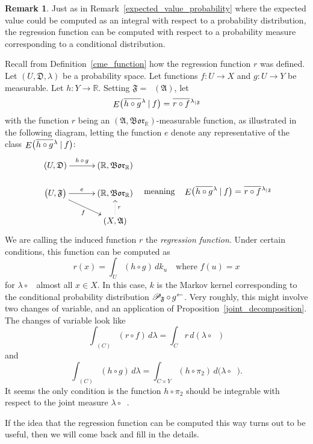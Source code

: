 \documentclass[
twoside=true,
paper=letter,
fontsize=9pt,
pagesize=auto,
leqno,
openany,
headsepline,
overfullrule,
]{scrbook}
\theoremstyle{plain}
\theoremstyle{plain}
\theoremstyle{definition}
\newtheorem{rmk}[thm]{Remark}
\theoremstyle{bfnoteitalic}
\theoremstyle{bfnoteroman}
\newcommand{\sigalg}[1]{\mathfrak{#1}}
\newcommand{\cali}[1]{\mathscr{#1}}
\newcommand{\given}{\mathbin{\vert}}
\newcommand{\kondexpgvn}[2]
{\mathop{E}\bigl(#1\given#2\bigr)}
\newcommand{\condprobop}[1]{\mathop{\cali{P}\hspace{-1pt}}\nolimits_{#1}}
\newcommand{\borel}{\mathfrak{Bor}}
\newcommand{\restrictedto}[1]{_{\lvert#1}\kern-1.5pt}
\newcommand{\preimage}[1]{\mathop{#1^{\leftarrow}}}
\newcommand{\R}{\mathbb{R}}
\newcommand{\sigmaalgebra}{\sigalg{A}}
\newcommand{\funcf}{f}
\newcommand{\funcg}{g}
\newcommand{\funch}{h}
\newcommand{\funck}{k}
\newcommand{\measurespace}{X}
\newcommand{\measurespaceii}{Y}
\newcommand{\mspaceelt}{x}
\newcommand{\measlambda}{\lambda}
\newcommand{\setiii}{C}
\newcommand{\projectiontwo}{\pi_2}
\newcommand{\uspace}{U}%
\newcommand{\uspaceelt}{u}
\newcommand{\uspacesig}{\sigalg{D}}
\newcommand*\xbar[1]{%
   \hbox{%
     \vbox{%
       \hrule height 0.4pt %
       \kern0.4ex%
       \hbox{%
         \ensuremath{#1}%
       }%
     }%
   }%
}
\newcommand{\lebclass}[1]{\hspace{.5pt}\xbar{#1}\hspace{0.5pt}}
\newcommand{\ellclass}[2]{\lebclass{#1}^{#2}}
\begin{document}
\begin{rmk}
Just as in Remark~\ref{expected_value_probability} where the expected value could be computed as an integral with respect to a probability distribution, the regression function can be computed with respect to a probability measure corresponding to a conditional distribution.

Recall from Definition~\ref{cme_function} how the regression function $r$ was defined.
Let
$(\uspace,\uspacesig,\measlambda)$ be a probability space.
Let functions
$\funcf:\uspace\to\measurespace$
and
$\funcg:\uspace\to\measurespaceii$
be measurable.
Let $\funch:\measurespaceii\to\R$.
Setting $\sigalg{F}=\preimage{\funcf}(\sigmaalgebra)$, let
\[
\kondexpgvn{\ellclass{\funch\circ\funcg}{\measlambda}}{\funcf}
=
\ellclass{r \circ \funcf}{\measlambda\restrictedto{\sigalg{F}}}
\]
with the function  $r$ being an $(\sigmaalgebra,\borel_\R)$\hyp{}measurable function,
as illustrated in the following diagram, letting the function $e$ denote any representative of the class
$\kondexpgvn{\ellclass{\funch\circ\funcg}{\measlambda}}{\funcf}$:
\[
\begin{gathered}
\xymatrix@R=16pt@C=30pt{
(\uspace, \uspacesig)
\ar[r]^-{\funch\,\circ\,\funcg}
&
(\R, \borel_\R)
\\
\bigl(\uspace, \sigalg{F} \bigr)
\ar[r]^-{e}
\ar[dr]_{\funcf}
&
(\R,\borel_\R)
\\
&
(\measurespace, \sigmaalgebra)
\ar@{.>}[u]_{r}
\\
}
\end{gathered}
\quad
\text{meaning}
\quad
\kondexpgvn{\ellclass{\funch\circ\funcg}{\measlambda}}{\funcf}
=
\ellclass{r \circ \funcf}{\measlambda\restrictedto{\sigalg{F}}}
\]
We are calling the induced function $r$ the \emph{regression function}.
Under certain conditions, this function can be computed as
\[
r(\mspaceelt)
=
\int_\uspace (\funch\circ\funcg) \, d \funck_\uspaceelt
\quad
\text{where $\funcf(\uspaceelt)=\mspaceelt$}
\]
for $\measlambda\circ \preimage{\funcf}$ almost all $\mspaceelt\in\measurespace$.
In this case, $\funck$ is the Markov kernel corresponding to the conditional probability distribution
$\condprobop{\sigalg{F}}\circ \preimage{\funcg}$.
Very roughly, this might involve two changes of variable, and an application of
Proposition~\ref{joint_decomposition}.
The changes of variable look like
\[
\int_{\preimage{\funcf}(\setiii)}
(r\circ\funcf)\, d\measlambda
=
\int_\setiii r\, d(\lambda\circ\preimage{\funcf})
\]
and
\[
\int_{\preimage{\funcf}(\setiii)}
(\funch\circ\funcg)\, d\measlambda
=
\int_{\setiii\times\measurespaceii}
(\funch\circ\projectiontwo)
\,d\bigl( \measlambda \circ \preimage{(\funcf,\funcg)} \bigr).
\]
It seems the only condition is the function $\funch\circ\projectiontwo$ should be integrable with respect to the joint measure
$\measlambda \circ \preimage{(\funcf,\funcg)}$.

If the idea that the regression function can be computed this way turns out to be useful, then we will come back and fill in the details.
\end{rmk}
\end{document}

